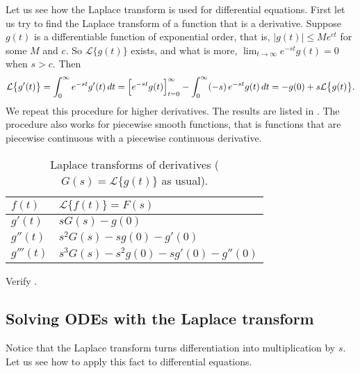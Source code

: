 Let us see how the Laplace transform is used for differential equations.
First let us try to find the Laplace transform of a function that is a
derivative.  Suppose $g(t)$ is a differentiable function
of exponential order, that is, $\lvert g(t) \rvert \leq M e^{ct}$ for some
$M$ and $c$.  So $\mathcal{L} \bigl\{ g(t) \bigr\}$ exists, and what is more,
$\lim_{t\to\infty} e^{-st}g(t) = 0$ when $s > c$.  Then
\begin{equation*}
\mathcal{L} \bigl\{ g'(t) \bigr\}
=
\int_0^\infty
e^{-st}
g'(t) \,dt
=
\Bigl[e^{-st} g(t) \Bigr]_{t=0}^\infty
-
\int_0^\infty
(-s)\,
e^{-st}
g(t) \,dt
=
-g(0) + s \mathcal{L} \bigl\{ g(t) \bigr\} .
\end{equation*}
We repeat this procedure for higher derivatives.
The results are
listed in .  The procedure also works for piecewise
smooth functions, that is functions that are piecewise continuous with a
piecewise continuous derivative.

\begin{table}[h!t]
\mybeginframe
\capstart
\begin{center}
\begin{tabular}{@{}ll@{}}
\toprule
$f(t)$ & $\mathcal{L} \bigl\{ f(t) \bigr\} = F(s)$ \\
\midrule
$g'(t)$ & $sG(s)-g(0)$ \\[4pt]
$g''(t)$ & $s^2G(s)-sg(0)-g'(0)$ \\[4pt]
$g'''(t)$ & $s^3G(s)-s^2g(0)-sg'(0)-g''(0)$ \\[4pt]
\bottomrule
\end{tabular}
\end{center}
\caption{Laplace transforms of derivatives
($G(s) = \mathcal{L} \bigl\{ g(t) \bigr\}$
as usual).\label{ltd:table}}
\myendframe
\end{table}

\begin{exercise}
Verify .
\end{exercise}

\subsection{Solving ODEs with the Laplace transform}

Notice that the Laplace transform turns differentiation into
multiplication by $s$.  Let us see how to apply this fact to differential
equations.

